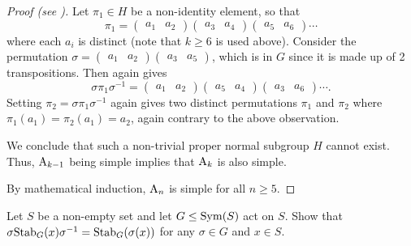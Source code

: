 \begin{proof}[Proof (see {\cite[Theorem 4.24]{dummit_foote_2004}})]
    Let $\pi_1 \in H$ be a non-identity element, so that
    \[
        \pi_1 = \begin{pmatrix}a_1&a_2\end{pmatrix} \begin{pmatrix}a_3&a_4\end{pmatrix} \begin{pmatrix}a_5&a_6\end{pmatrix}\cdots
    \]
    where each $a_i$ is distinct (note that $k \geq 6$ is used above). Consider the permutation $\sigma = \begin{pmatrix}a_1&a_2\end{pmatrix} \begin{pmatrix}a_3&a_5\end{pmatrix}$, which is in $G$ since it is made up of 2 transpositions. Then  again gives
    \[
        \sigma\pi_1\sigma^{-1} = \begin{pmatrix}a_1&a_2\end{pmatrix} \begin{pmatrix}a_5&a_4\end{pmatrix} \begin{pmatrix}a_3&a_6\end{pmatrix}\cdots.
    \]
    Setting $\pi_2 = \sigma\pi_1\sigma^{-1}$ again gives two distinct permutations $\pi_1$ and $\pi_2$ where $\pi_1(a_1) = \pi_2(a_1) = a_2$, again contrary to the above observation.

    We conclude that such a non-trivial proper normal subgroup $H$ cannot exist. Thus, $\mathrm{A}_{k-1}$ being simple implies that $\mathrm{A}_{k}$ is also simple.

    By mathematical induction, $\mathrm{A}_{n}$ is simple for all $n \geq 5$.
\end{proof}

\begin{exercise}\label{exercise-conjugate-of-stabilizer}
    Let $S$ be a non-empty set and let $G \leq \mathrm{Sym}(S)$ act on $S$. Show that $\sigma\mathrm{Stab}_{G}(x)\sigma^{-1} = \mathrm{Stab}_{G}(\sigma(x))$ for any $\sigma \in G$ and $x \in S$.
\end{exercise}

